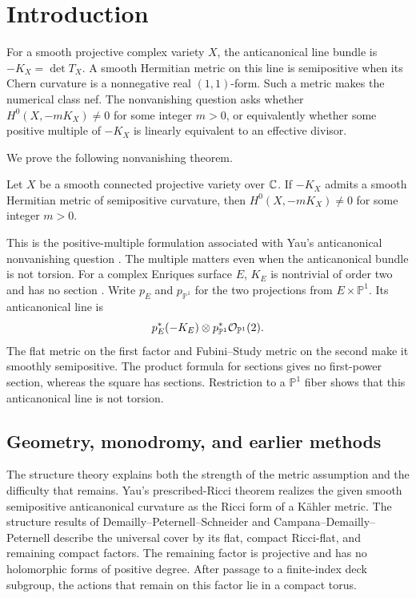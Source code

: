 \section{Introduction}
\label{sec:introduction}

For a smooth projective complex variety \(X\), the anticanonical line
bundle is \(-K_X=\det T_X\). A smooth Hermitian metric on this line is
semipositive when its Chern curvature is a nonnegative real \((1,1)\)-form.
Such a metric makes the numerical class nef. The nonvanishing question
asks whether \(H^0(X,-mK_X)\ne0\) for some integer \(m>0\), or
equivalently whether some positive multiple of \(-K_X\) is linearly
equivalent to an effective divisor.

We prove the following nonvanishing theorem.

\begin{theorem}\label{thm:headline}
Let \(X\) be a smooth connected projective variety over \(\mathbb C\).
If \(-K_X\) admits a smooth Hermitian metric of semipositive curvature,
then \(H^0(X,-mK_X)\ne0\) for some integer \(m>0\).
\end{theorem}

This is the positive-multiple formulation associated with Yau's
anticanonical nonvanishing question \cite[Problem~75, p.~395]{Yau1994}.
The multiple matters even when the anticanonical bundle is not torsion.
For a complex Enriques surface \(E\), \(K_E\) is nontrivial of order two
and has no section \cite[Section~3]{Dolgachev2016}.
Write \(p_E\) and \(p_{\mathbb P^1}\) for the two projections from
\(E\times\mathbb P^1\). Its anticanonical line is
\[
 p_E^*(-K_E)\otimes p_{\mathbb P^1}^*\mathcal O_{\mathbb P^1}(2).
\]
The flat metric on the first factor and Fubini--Study metric on the
second make it smoothly semipositive. The product formula for sections
gives no first-power section, whereas the square has sections.
Restriction to a \(\mathbb P^1\) fiber shows that this anticanonical
line is not torsion.

\subsection{Geometry, monodromy, and earlier methods}

The structure theory explains both the strength of the metric assumption
and the difficulty that remains. Yau's prescribed-Ricci theorem
\cite{Yau1978} realizes the given smooth semipositive anticanonical
curvature as the Ricci form of a K\"ahler metric. The structure results
of Demailly--Peternell--Schneider \cite[Structure Theorem, p.~218]{DPS1996} and
Campana--Demailly--Peternell \cite[Theorem~1.4]{CDP2015} describe the
universal cover by its flat, compact Ricci-flat, and remaining compact
factors. The remaining factor is projective and has no holomorphic forms
of positive degree. After passage to a finite-index deck subgroup, the
actions that remain on this factor lie in a compact torus.


